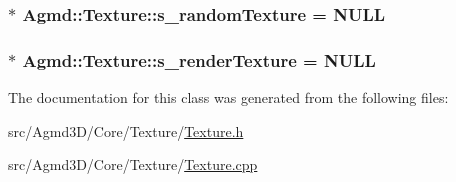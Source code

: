 \hypertarget{class_agmd_1_1_texture_a8ee8af75096b75990934221d5151c875}{
\subsubsection[{s\+\_\+random\+Texture}]{ $\ast$ Agmd\+::\+Texture\+::s\+\_\+random\+Texture = N\+U\+L\+L\hspace{0.3cm}{\ttfamily [static]}}}\label{class_agmd_1_1_texture_a8ee8af75096b75990934221d5151c875}
\hypertarget{class_agmd_1_1_texture_a51dca7410fffcf8b9f78631b9bc4b3da}{
\subsubsection[{s\+\_\+render\+Texture}]{ $\ast$ Agmd\+::\+Texture\+::s\+\_\+render\+Texture = N\+U\+L\+L\hspace{0.3cm}{\ttfamily [static]}}}\label{class_agmd_1_1_texture_a51dca7410fffcf8b9f78631b9bc4b3da}


The documentation for this class was generated from the following files\+:\begin{DoxyCompactItemize}
\item 
src/\+Agmd3\+D/\+Core/\+Texture/\hyperlink{_texture_8h}{Texture.\+h}\item 
src/\+Agmd3\+D/\+Core/\+Texture/\hyperlink{_texture_8cpp}{Texture.\+cpp}\end{DoxyCompactItemize}
